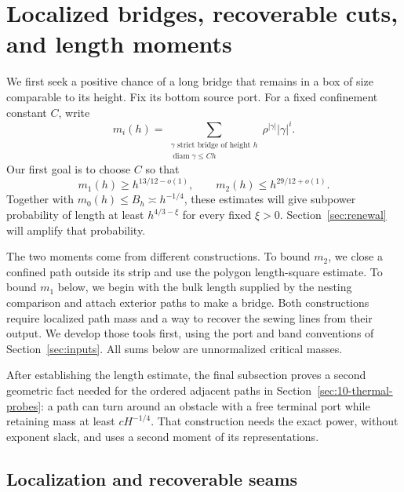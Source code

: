 \section{Localized bridges, recoverable cuts, and length moments}
\label{sec:08-sewing-renewal}

We first seek a positive chance of a long bridge that remains in a box
of size comparable to its height. Fix its bottom source port. For a fixed
confinement constant $C$, write
\[
 m_i(h)=\sum_{\substack{\gamma\text{ strict bridge of height }h\\
                         \operatorname{diam}\gamma\le Ch}}
              \rho^{|\gamma|}|\gamma|^i.
\]
Our first goal is to choose $C$ so that
\[
 m_1(h)\ge h^{13/12-o(1)},\qquad
 m_2(h)\le h^{29/12+o(1)}.
\]
Together with $m_0(h)\le B_h\asymp h^{-1/4}$, these estimates will give
subpower probability of length at least $h^{4/3-\xi}$ for every fixed
$\xi>0$. Section~\ref{sec:renewal} will amplify that probability.

The two moments come from different constructions. To bound $m_2$, we
close a confined path outside its strip and use the polygon length-square
estimate. To bound $m_1$ below, we begin with the bulk length supplied by
the nesting comparison and attach exterior paths to make a bridge.
Both constructions require localized path mass and a way to recover the
sewing lines from their output. We develop those tools first, using the
port and band conventions of Section~\ref{sec:inputs}. All sums below are
unnormalized critical masses.

After establishing the length estimate, the final subsection proves a
second geometric fact needed for the ordered adjacent paths in
Section~\ref{sec:10-thermal-probes}: a path can turn around an obstacle
with a free terminal port while retaining mass at least $cH^{-1/4}$.
That construction needs the exact power, without exponent slack, and
uses a second moment of its representations.

\subsection{Localization and recoverable seams}


